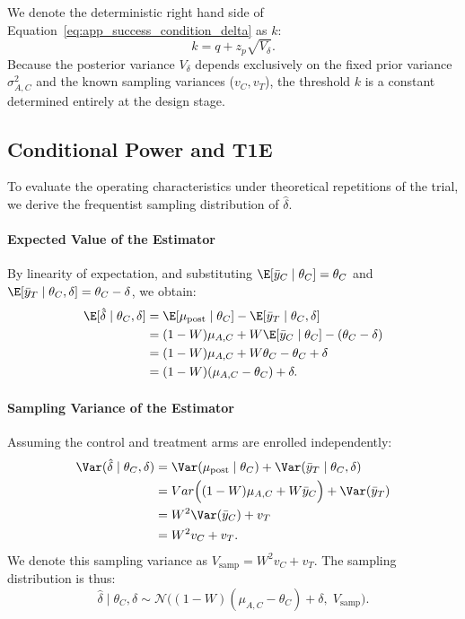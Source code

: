 We denote the deterministic right hand side of Equation~\eqref{eq:app_success_condition_delta} as $k$:
$$
    k = q + z_p \sqrt{V_{\delta}}.
$$
Because the posterior variance $V_{\delta}$ depends exclusively on the fixed prior variance $\sigma_{A,C}^2$ and the known sampling variances ($v_C, v_T$), the threshold $k$ is a constant determined entirely at the design stage.


\subsection{Conditional Power and T1E}

To evaluate the operating characteristics under theoretical repetitions of the trial, we derive the frequentist sampling distribution of $\hat{\delta}$.

\paragraph{Expected Value of the Estimator}
By linearity of expectation, and substituting $\E[\bar{y}_C \mid \theta_C] = \theta_C$ and $\E[\bar{y}_T \mid \theta_C, \delta] = \theta_C - \delta$, we obtain:
\begin{align}
    \E[\hat{\delta} \mid \theta_C, \delta] &= \E[\mu_{\text{post}} \mid \theta_C] - \E[\bar{y}_T \mid \theta_C, \delta] \nonumber \\
    &= (1 - W)\mu_{A,C} + W \E[\bar{y}_C \mid \theta_C] - (\theta_C - \delta) \nonumber \\
    &= (1 - W)\mu_{A,C} + W\theta_C - \theta_C + \delta \nonumber \\
    &= (1 - W)(\mu_{A,C} - \theta_C) + \delta. \label{eq:app_expected_delta}
\end{align}

\paragraph{Sampling Variance of the Estimator}
Assuming the control and treatment arms are enrolled independently:
\begin{align}
    \Var(\hat{\delta} \mid \theta_C, \delta) &= \Var(\mu_{\text{post}} \mid \theta_C) + \Var(\bar{y}_T \mid \theta_C, \delta) \nonumber \\
    &= Var\Big((1 - W)\mu_{A,C} + W\bar{y}_C\Big) + \Var(\bar{y}_T) \nonumber \\
    &= W^2 \Var(\bar{y}_C) + v_T \nonumber \\
    &= W^2 v_C + v_T. \label{eq:app_variance_delta}
\end{align}
We denote this sampling variance as $V_{\text{samp}} = W^2 v_C + v_T$. The sampling distribution is thus:
$$
    \hat{\delta} \mid \theta_C, \delta \sim \mathcal{N}\Big( (1 - W)(\mu_{A,C} - \theta_C) + \delta, \; V_{\text{samp}} \Big).
$$

